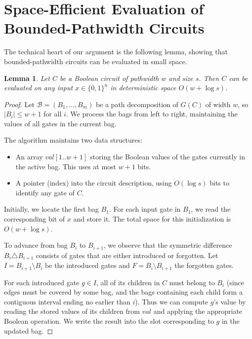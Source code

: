 \documentclass[11pt]{article}
\newtheorem{lemma}[theorem]{Lemma}
\begin{document}
\section{Space-Efficient Evaluation of Bounded-Pathwidth Circuits}

The technical heart of our argument is the following lemma, showing that
bounded-pathwidth circuits can be evaluated in small space.

\begin{lemma}
  \label{lem:space-eval}
  Let $C$ be a Boolean circuit of pathwidth $w$ and size $s$.  Then $C$ can
  be evaluated on any input $x \in \{0,1\}^n$ in deterministic space
  $O(w + \log s)$.
\end{lemma}

\begin{proof}
  Let $\mathcal{B} = (B_1, \dots, B_m)$ be a path decomposition of $G(C)$ of
  width $w$, so $|B_i| \leq w+1$ for all $i$.  We process the bags from left
  to right, maintaining the values of all gates in the current bag.

  The algorithm maintains two data structures:
  \begin{itemize}
    \item An array $\mathit{val}[1..w+1]$ storing the Boolean values of the
      gates currently in the active bag.  This uses at most $w+1$ bits.
    \item A pointer (index) into the circuit description, using $O(\log s)$
      bits to identify any gate of $C$.
  \end{itemize}

  Initially, we locate the first bag $B_1$.  For each input gate in $B_1$,
  we read the corresponding bit of $x$ and store it.  The total space for
  this initialization is $O(w + \log s)$.

  To advance from bag $B_i$ to $B_{i+1}$, we observe that the symmetric
  difference $B_i \triangle B_{i+1}$ consists of gates that are either
  introduced or forgotten.  Let $I = B_{i+1} \setminus B_i$ be the introduced
  gates and $F = B_i \setminus B_{i+1}$ the forgotten gates.

  For each introduced gate $g \in I$, all of its children in $C$ must belong
  to $B_i$ (since edges must be covered by some bag, and the bags containing
  each child form a contiguous interval ending no earlier than $i$).  Thus we
  can compute $g$'s value by reading the stored values of its children from
  $\mathit{val}$ and applying the appropriate Boolean operation.  We write the
  result into the slot corresponding to $g$ in the updated bag.


\end{proof}
\end{document}
